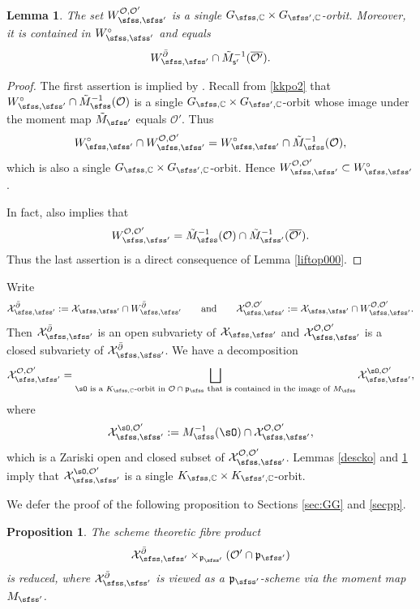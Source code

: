 \documentclass[12pt,a4paper]{amsart}
\newcommand{\CO}{{\mathcal {O}}}
\newcommand{\CX}{{\mathcal {X}}}
\newcommand{\p}{\mathfrak p}
\numberwithin{equation}{section}
\newtheorem{lem}[thm]{Lemma}
\newtheorem{prop}[thm]{Proposition}
\theoremstyle{remark}
\begin{document}
\begin{lem}\label{liftop0}
The set $W_{\sfss, \sfss'}^{\CO, \CO'}$ is  a single $G_{\sfss, \C}\times G_{\sfss',\C}$-orbit. Moreover, it is  contained in $W_{\sfss,\sfss'}^\circ$ and equals
\[
   W_{\sfss, \sfss'}^{\bar \partial} \cap \tilde M_{\mathsf s'}^{-1}(\overline{\CO'}).
\]
\end{lem}
\begin{proof}
The first assertion is implied by \cite[Theorem 3.6]{DKPC}. Recall from \eqref{kkpo2} that $W_{\sfss,\sfss'}^\circ\cap \tilde M_{\sfss}^{-1}(\CO)$ is a single  $G_{\sfss, \C}\times G_{\sfss',\C}$-orbit  whose image under the moment map $\tilde M_{\sfss'}$ equals $\CO'$. Thus
\[
W_{\sfss,\sfss'}^\circ\cap W_{\sfss, \sfss'}^{\CO, \CO'}=W_{\sfss,\sfss'}^\circ\cap \tilde M_{\sfss}^{-1}(\CO),
\]
which  is also a   single  $G_{\sfss, \C}\times G_{\sfss',\C}$-orbit. Hence $W_{\sfss, \sfss'}^{\CO, \CO'}\subset W_{\sfss,\sfss'}^\circ$. 

In fact, \cite[Theorem 3.6]{DKPC} also implies that
\[
W_{\sfss, \sfss'}^{\CO, \CO'}=\tilde M_{\sfss}^{-1}(\CO)\cap  \tilde M_{\sfss'}^{-1}(\overline{\CO'}).
\]
Thus the last assertion is a direct consequence of Lemma \ref{liftop000}.

\end{proof}



Write
\[
    \CX_{\sfss, \sfss'}^{\bar \partial}:=\CX_{\sfss, \sfss'} \cap W_{\sfss, \sfss'}^{\bar \partial}\qquad\textrm{and}\qquad \CX_{\sfss, \sfss'}^{\CO, \CO'}:=\CX_{\sfss, \sfss'} \cap W_{\sfss, \sfss'}^{\CO, \CO'}.
   \]
Then  $ \CX_{\sfss, \sfss'}^{\bar \partial}$ is an open subvariety of $ \CX_{\sfss, \sfss'}$ and  $\CX_{\sfss, \sfss'}^{\CO, \CO'}$ is a  closed subvariety of  $\CX_{\sfss, \sfss'}^{\bar \partial}$. We have a decomposition
 \[
   \CX_{\sfss, \sfss'}^{\CO, \CO'}=\bigsqcup_{\sO\textrm{ is a   $K_{\sfss, \C}$-orbit in $ \CO\cap \p_\sfss$ that is contained in the image of $M_\sfss$}}  \CX_{\sfss, \sfss'}^{\sO, \CO'},
 \]
 where
 \[
   \CX_{\sfss, \sfss'}^{\sO, \CO'}:=M_\sfss^{-1}(\sO)\cap \CX_{\sfss, \sfss'}^{\CO, \CO'},
 \]
 which is a Zariski open and closed subset of $\CX_{\sfss, \sfss'}^{\CO, \CO'}$. Lemmas \ref{descko} and \ref{liftop0} imply that $ \CX_{\sfss, \sfss'}^{\sO, \CO'}$ is a single $K_{\sfss, \C}\times K_{\sfss',\C}$-orbit.

\medskip

We defer the proof of the following proposition to Sections \ref{sec:GG} and \ref{secpp}.
\begin{prop}\label{propreduced}
 The scheme theoretic  fibre product
\[
\CX_{\sfss, \sfss'}^{\bar \partial}\times_{\p_{\sfss'}} ({\CO'}\cap \p_{\sfss'})
\]
is reduced, where $\CX_{\sfss, \sfss'}^{\bar \partial}$ is viewed as a $\p_{\sfss'}$-scheme via the moment map $M_{\sfss'}$.
\end{prop}
\end{document}
